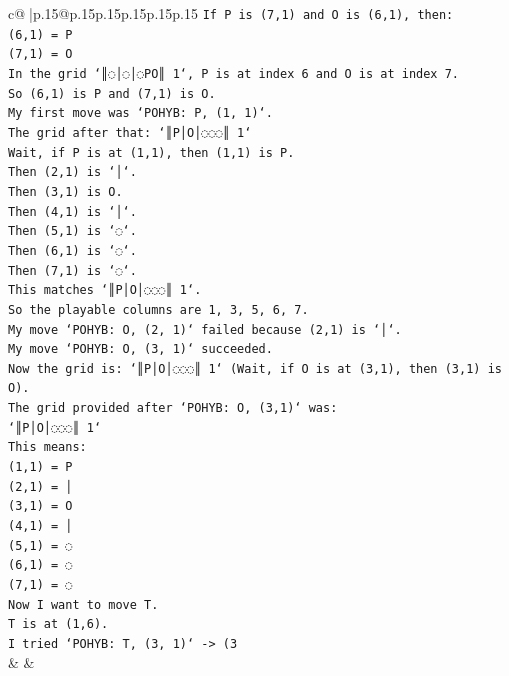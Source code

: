 \documentclass{article}
\begin{document}
{\begin{supertabular}{c@{$\;$}|p{.15\linewidth}@{}p{.15\linewidth}p{.15\linewidth}p{.15\linewidth}p{.15\linewidth}p{.15\linewidth}}
{{{\texttt{If P is (7,1) and O is (6,1), then:} \\
\texttt{(6,1) = P} \\
\texttt{(7,1) = O} \\
\texttt{In the grid `║◌│◌│◌PO║ 1`, P is at index 6 and O is at index 7.} \\
\texttt{So (6,1) is P and (7,1) is O.} \\
\texttt{My first move was `POHYB: P, (1, 1)`.} \\
\texttt{The grid after that: `║P│O│◌◌◌║ 1`} \\
\texttt{Wait, if P is at (1,1), then (1,1) is P.} \\
\texttt{Then (2,1) is `│`.} \\
\texttt{Then (3,1) is O.} \\
\texttt{Then (4,1) is `│`.} \\
\texttt{Then (5,1) is `◌`.} \\
\texttt{Then (6,1) is `◌`.} \\
\texttt{Then (7,1) is `◌`.} \\
\texttt{This matches `║P│O│◌◌◌║ 1`.} \\
\texttt{So the playable columns are 1, 3, 5, 6, 7.} \\
\texttt{My move `POHYB: O, (2, 1)` failed because (2,1) is `│`.} \\
\texttt{My move `POHYB: O, (3, 1)` succeeded.} \\
\texttt{Now the grid is: `║P│O│◌◌◌║ 1` (Wait, if O is at (3,1), then (3,1) is O).} \\
\texttt{The grid provided after `POHYB: O, (3,1)` was:} \\
\texttt{`║P│O│◌◌◌║ 1`} \\
\texttt{This means:} \\
\texttt{(1,1) = P} \\
\texttt{(2,1) = │} \\
\texttt{(3,1) = O} \\
\texttt{(4,1) = │} \\
\texttt{(5,1) = ◌} \\
\texttt{(6,1) = ◌} \\
\texttt{(7,1) = ◌} \\
\texttt{Now I want to move T.} \\
\texttt{T is at (1,6).} \\
\texttt{I tried `POHYB: T, (3, 1)` {-}> (3} \\
            }
        }
    }
    & & \\ \\


\end{supertabular}}
\end{document}
